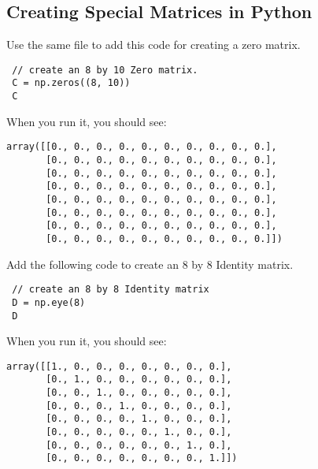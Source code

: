 \subsection{Creating Special Matrices in Python}
 Use the same file to add this code for creating a zero matrix.
\begin{Verbatim}
 // create an 8 by 10 Zero matrix.
 C = np.zeros((8, 10))
 C
\end{Verbatim}
When you run it, you should see:
\begin{Verbatim}
array([[0., 0., 0., 0., 0., 0., 0., 0., 0., 0.],
       [0., 0., 0., 0., 0., 0., 0., 0., 0., 0.],
       [0., 0., 0., 0., 0., 0., 0., 0., 0., 0.],
       [0., 0., 0., 0., 0., 0., 0., 0., 0., 0.],
       [0., 0., 0., 0., 0., 0., 0., 0., 0., 0.],
       [0., 0., 0., 0., 0., 0., 0., 0., 0., 0.],
       [0., 0., 0., 0., 0., 0., 0., 0., 0., 0.],
       [0., 0., 0., 0., 0., 0., 0., 0., 0., 0.]])
\end{Verbatim}
Add the following code to create an 8 by 8 Identity matrix.
\begin{Verbatim}
 // create an 8 by 8 Identity matrix 
 D = np.eye(8)
 D
\end{Verbatim}
When you run it, you should see:
\begin{Verbatim}
array([[1., 0., 0., 0., 0., 0., 0., 0.],
       [0., 1., 0., 0., 0., 0., 0., 0.],
       [0., 0., 1., 0., 0., 0., 0., 0.],
       [0., 0., 0., 1., 0., 0., 0., 0.],
       [0., 0., 0., 0., 1., 0., 0., 0.],
       [0., 0., 0., 0., 0., 1., 0., 0.],
       [0., 0., 0., 0., 0., 0., 1., 0.],
       [0., 0., 0., 0., 0., 0., 0., 1.]])
\end{Verbatim}

